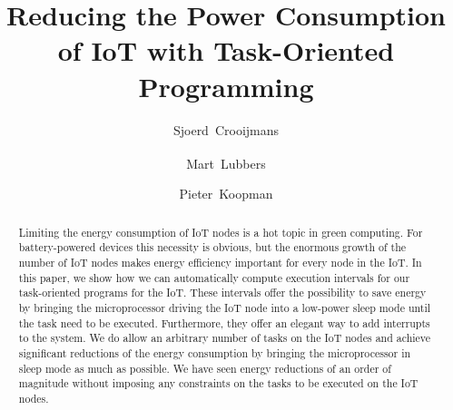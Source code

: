 \documentclass[runningheads]{llncs}
\begin{document}
%
\title{Reducing the Power Consumption of IoT with Task-Oriented Programming}
%
%
\author{%
	Sjoerd~Crooijmans \and %
	Mart~Lubbers\textsuperscript{\Letter} \and %
	Pieter~Koopman %
}
%
%
%
\maketitle              %
%

\begin{abstract}
	Limiting the energy consumption of IoT nodes is a hot topic in green computing. For battery-powered devices this necessity is obvious, but the enormous growth of the number of IoT nodes makes energy efficiency important for every node in the IoT.
	In this paper, we show how we can automatically compute execution intervals for our task-oriented programs for the IoT.
	These intervals offer the possibility to save energy by bringing the microprocessor driving the IoT node into a low-power sleep mode until the task need to be executed.
	Furthermore, they offer an elegant way to add interrupts to the system.
	We do allow an arbitrary number of tasks on the IoT nodes and achieve significant reductions of the energy consumption by bringing the microprocessor in sleep mode as much as possible.
	We have seen energy reductions of an order of magnitude without imposing any constraints on the tasks to be executed on the IoT nodes.

\end{abstract}
%
\end{document}
